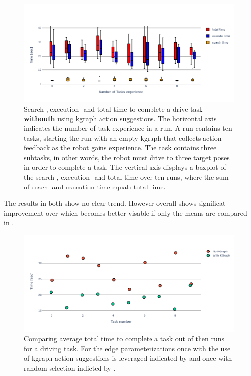 \begin{figure}[H]
    \centering
    \includegraphics[width=\textwidth]{figures/results/random_drive_time_no_kgraph}
    \caption{Search-, execution- and total time to complete a drive task \textbf{withouth} using \ac{kgraph} action suggestions. The horizontal axis indicates the number of task experience in a run. A run contains ten tasks, starting the run with an empty \ac{kgraph} that collects action feedback as the robot gains experience. The task contains three subtasks, in other words, the robot must drive to three target poses in order to complete a task. The vertical axis displays a boxplot of the search-, execution- and total time over ten runs, where the sum of seach- and execution time equals total time.}%
   \label{fig:random_drive_time_no_kgraph}
\end{figure}


The results in both  show no clear trend. However overall  shows significat improvement over  which becomes better visable if only the means are compared in .\bs

\begin{figure}[H]
    \centering
    \includegraphics[width=\textwidth]{figures/results/random_drive_time_vs}
    \caption{Comparing average total time to complete a task out of then runs for a driving task. For the edge parameterizations once with the use of \ac{kgraph} action suggestions is leveraged indicated by  and once with random selection indicted by .}%
    \label{fig:random_drive_time_vs}
\end{figure}

